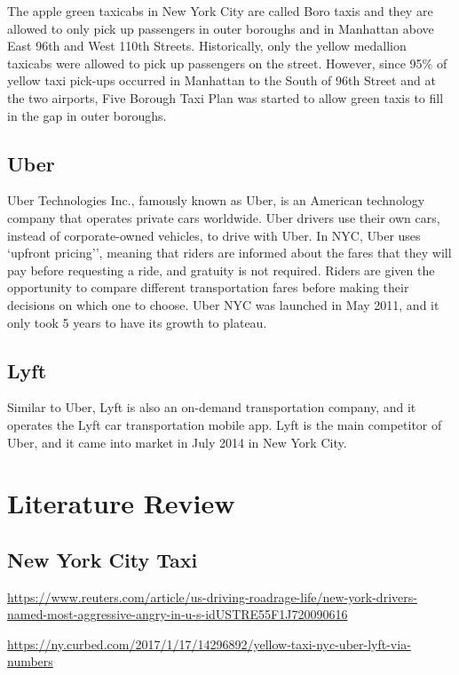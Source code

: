 \documentclass[12pt,twoside]{reedthesis}
\theoremstyle{definition}
\theoremstyle{definition}
\theoremstyle{definition}
\theoremstyle{remark}
\begin{document}
The apple green taxicabs in New York City are called Boro taxis and they
are allowed to only pick up passengers in outer boroughs and in
Manhattan above East 96th and West 110th Streets. Historically, only the
yellow medallion taxicabs were allowed to pick up passengers on the
street. However, since 95\% of yellow taxi pick-ups occurred in
Manhattan to the South of 96th Street and at the two airports, Five
Borough Taxi Plan was started to allow green taxis to fill in the gap in
outer boroughs.

\subsection{Uber}\label{uber}

Uber Technologies Inc., famously known as Uber, is an American
technology company that operates private cars worldwide. Uber drivers
use their own cars, instead of corporate-owned vehicles, to drive with
Uber. In NYC, Uber uses `upfront pricing'', meaning that riders are
informed about the fares that they will pay before requesting a ride,
and gratuity is not required. Riders are given the opportunity to
compare different transportation fares before making their decisions on
which one to choose. Uber NYC was launched in May 2011, and it only took
5 years to have its growth to plateau.

\subsection{Lyft}\label{lyft}

Similar to Uber, Lyft is also an on-demand transportation company, and
it operates the Lyft car transportation mobile app. Lyft is the main
competitor of Uber, and it came into market in July 2014 in New York
City.

\section{Literature Review}\label{literature-review}

\subsection{New York City Taxi}\label{new-york-city-taxi}

\url{https://www.reuters.com/article/us-driving-roadrage-life/new-york-drivers-named-most-aggressive-angry-in-u-s-idUSTRE55F1J720090616}

\url{https://ny.curbed.com/2017/1/17/14296892/yellow-taxi-nyc-uber-lyft-via-numbers}
\end{document}
